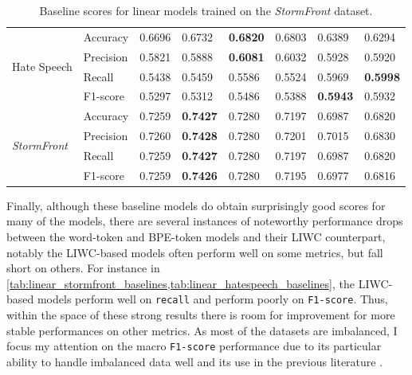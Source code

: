 \begin{table}
{\begin{tabular}{ll|ll|ll|ll}
    \multirow{4}{*}{Hate Speech}          & Accuracy  & 0.6696      & 0.6732        & \bf{0.6820} & 0.6803      & 0.6389      & 0.6294      \\
                                          & Precision & 0.5821      & 0.5888        & \bf{0.6081} & 0.6032      & 0.5928      & 0.5920      \\
                                          & Recall    & 0.5438      & 0.5459        & 0.5586      & 0.5524      & 0.5969      & \bf{0.5998} \\
                                          & F1-score  & 0.5297      & 0.5312        & 0.5486      & 0.5388      & \bf{0.5943} & 0.5932      \\\hline
    \multirow{4}{*}{\textit{StormFront}}  & Accuracy  & 0.7259      & \bf{0.7427}   & 0.7280      & 0.7197      & 0.6987      & 0.6820      \\
                                          & Precision & 0.7260      & \bf{0.7428}   & 0.7280      & 0.7201      & 0.7015      & 0.6830      \\
                                          & Recall    & 0.7259      & \bf{0.7427}   & 0.7280      & 0.7197      & 0.6987      & 0.6820      \\
                                          & F1-score  & 0.7259      & \bf{0.7426}   & 0.7280      & 0.7195      & 0.6977      & 0.6816
    \end{tabular}%
    }
    \caption{Baseline scores for linear models trained on the \textit{StormFront} dataset.}
    \label{tab:linear_stormfront_baselines}
\end{table}

Finally, although these baseline models do obtain surprisingly good scores for many of the models, there are several instances of noteworthy performance drops between the word-token and BPE-token models and their LIWC counterpart, notably the LIWC-based models often perform well on some metrics, but fall short on others. For instance in \cref{tab:linear_stormfront_baselines,tab:linear_hatespeech_baselines}, the LIWC-based models perform well on \texttt{recall} and perform poorly on \texttt{F1-score}. Thus, within the space of these strong results there is room for improvement for more stable performances on other metrics.
As most of the datasets are imbalanced, I focus my attention on the macro \texttt{F1-score} performance due to its particular ability to handle imbalanced data well and its use in the previous literature \citep{Macro F1 papers}.

